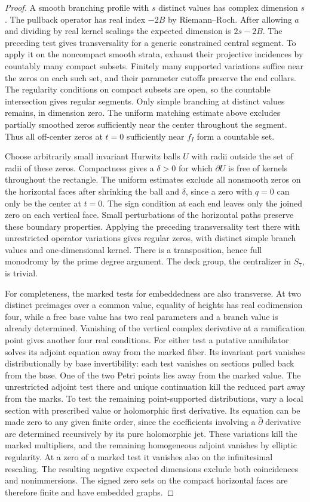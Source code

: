 \begin{proof}
A smooth branching profile with $s$ distinct values has complex
dimension $s$. The pullback operator has real index $-2B$ by
Riemann--Roch. After allowing $a$ and dividing by real kernel
scalings the expected dimension is $2s-2B$. The preceding test
gives transversality for a generic constrained central segment.
To apply it on the noncompact smooth strata, exhaust their
projective incidences by countably many compact subsets. Finitely
many supported variations suffice near the zeros on each such set,
and their parameter cutoffs preserve the end collars. The regularity
conditions on compact subsets are open, so the countable
intersection gives regular segments. Only simple branching at
distinct values remains, in dimension zero. The uniform matching
estimate above excludes partially smoothed zeros sufficiently near
the center throughout the segment. Thus all off-center zeros at
$t=0$ sufficiently near $f_I$ form a countable set.

Choose arbitrarily small invariant Hurwitz balls $U$ with radii
outside the set of radii of these zeros. Compactness gives a
$\delta>0$ for which $\partial U$ is free of kernels throughout the
rectangle. The uniform estimates exclude all nonsmooth zeros on
the horizontal faces after shrinking the ball and $\delta$, since
a zero with $q=0$ can only be the center at $t=0$.
The sign condition at each end leaves only the joined zero on each
vertical face. Small perturbations of the horizontal paths preserve
these boundary properties. Applying the preceding transversality
test there with unrestricted operator variations gives regular
zeros, with distinct simple branch values and one-dimensional
kernel. There is a transposition, hence full monodromy by the prime
degree argument. The deck group, the centralizer in $S_7$, is trivial.

For completeness, the marked tests for embeddedness are also
transverse. At two distinct preimages over a common value, equality
of heights has real codimension four, while a free base value has
two real parameters and a branch value is already determined.
Vanishing of the vertical complex derivative at a ramification
point gives another four real conditions. For either test a
putative annihilator solves its adjoint equation away from the
marked fiber. Its invariant part vanishes distributionally by base
invertibility: each test vanishes on sections pulled back from the
base. One of the two Petri points lies away from the marked value.
The unrestricted adjoint test there and unique continuation kill the
reduced part away from the marks. To test the remaining point-supported
distributions, vary a local section with prescribed value or
holomorphic first derivative. Its equation can be made zero to
any given finite order, since the coefficients involving a
$\bar\partial$ derivative are determined recursively by its pure
holomorphic jet. These variations kill the marked multipliers,
and the remaining homogeneous adjoint vanishes by elliptic regularity.
At a zero of a marked test it vanishes also on the infinitesimal
rescaling. The resulting negative expected dimensions exclude both
coincidences and nonimmersions. The signed zero sets on the compact
horizontal faces are therefore finite and have embedded graphs.


\end{proof}
